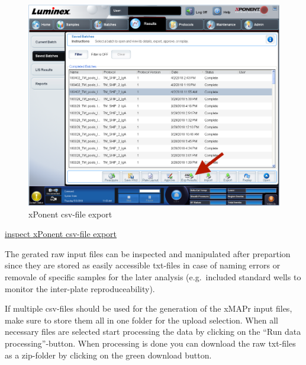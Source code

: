 \documentclass[]{book}
\theoremstyle{definition}
\theoremstyle{definition}
\theoremstyle{definition}
\theoremstyle{remark}
\begin{document}
\begin{figure}

{\centering \includegraphics[width=17.81in]{figures/xPonent_export} 

}

\caption{xPonent csv-file export}\label{fig:xPonentCSVexport}
\end{figure}

\href{figures/xMAPr_analysis_workflow.png}{inspect xPonent csv-file
export}

The gerated raw input files can be inspected and manipulated after
prepartion since they are stored as easily accessible txt-files in case
of naming errors or removale of specific samples for the later analysis
(e.g.~included standard wells to monitor the inter-plate
reproduceability).

If multiple csv-files should be used for the generation of the xMAPr
input files, make sure to store them all in one folder for the upload
selection. When all necessary files are selected start processing the
data by clicking on the ``Run data processing''-button. When processing
is done you can download the raw txt-files as a zip-folder by clicking
on the green download button.
\end{document}
